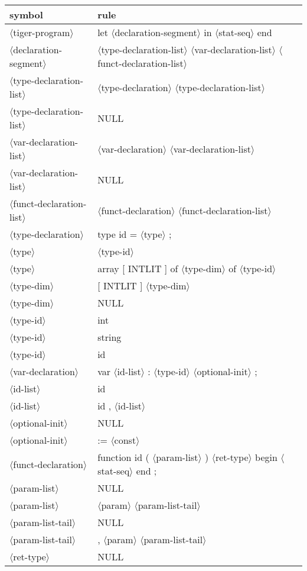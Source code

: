 \documentclass[11pt, fleqn]{article}
\newcommand{\atag}[1]{$\langle$#1$\rangle$}
\begin{document}
\begin{longtable}{l|l}
symbol							&	rule								\\
\hline
\atag{tiger-program}				&	let \atag{declaration-segment} in \atag{stat-seq} end				\\
\atag{declaration-segment}		&	\atag{type-declaration-list}	\atag{var-declaration-list} \atag{funct-declaration-list}	\\
\atag{type-declaration-list}		&	\atag{type-declaration} \atag{type-declaration-list}	\\
\atag{type-declaration-list}		&	NULL		\\
\atag{var-declaration-list}		&	\atag{var-declaration} \atag{var-declaration-list}	\\
\atag{var-declaration-list}		&	NULL		\\
\atag{funct-declaration-list}	&	\atag{funct-declaration} \atag{funct-declaration-list}	\\
\atag{type-declaration}			&	type id = \atag{type} ;		\\
\atag{type}						&	\atag{type-id}		\\
\atag{type}						&	array [ INTLIT ] of \atag{type-dim} of \atag{type-id}	\\
\atag{type-dim}					&	[ INTLIT ] \atag{type-dim}	\\
\atag{type-dim}					&	NULL		\\
\atag{type-id}					&	int		\\
\atag{type-id}					&	string		\\
\atag{type-id}					&	id		\\
\atag{var-declaration}			&	var \atag{id-list} : \atag{type-id} \atag{optional-init} ;		\\
\atag{id-list}					&	id		\\
\atag{id-list}					&	id , \atag{id-list}		\\
\atag{optional-init}				&	NULL		\\
\atag{optional-init}				&	:= \atag{const}		\\
\atag{funct-declaration}			&	function id ( \atag{param-list} ) \atag{ret-type} begin \atag{stat-seq} end ;	\\
\atag{param-list}				&	NULL		\\
\atag{param-list}				&	\atag{param}	 \atag{param-list-tail}	\\
\atag{param-list-tail}			&	NULL		\\
\atag{param-list-tail}			&	, \atag{param} \atag{param-list-tail}		\\
\atag{ret-type}					&	NULL		\\

\end{longtable}
\end{document}
